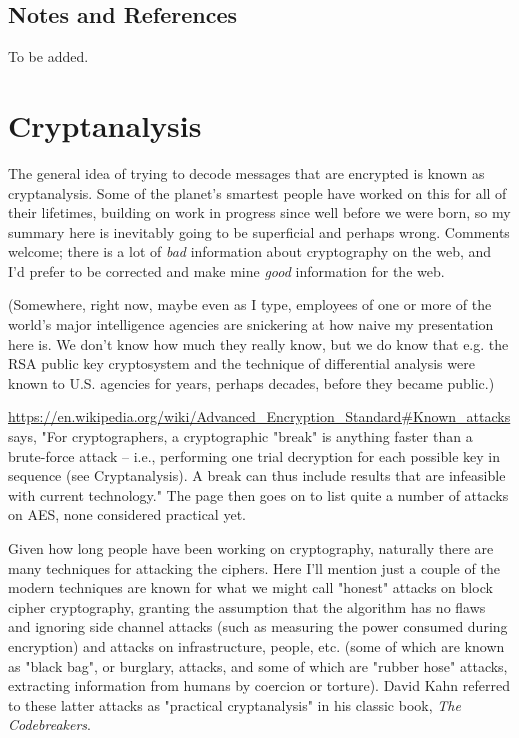 \documentclass[%
 aip,
 jmp,%
 amsmath,amssymb,
 reprint,%
]{revtex4-1}
\begin{document}
\subsection{Notes and References}

To be added.

\section{Cryptanalysis}

The general idea of trying to decode messages that are encrypted is
known as cryptanalysis.  Some of the planet's smartest people have
worked on this for all of their lifetimes, building on work in
progress since well before we were born, so my summary here is
inevitably going to be superficial and perhaps wrong.  Comments
welcome; there is a lot of \emph{bad} information about cryptography on the
web, and I'd prefer to be corrected and make mine \emph{good} information
for the web.

(Somewhere, right now, maybe even as I type, employees of one or more
of the world's major intelligence agencies are snickering at how naive
my presentation here is.  We don't know how much they really know, but
we do know that e.g. the RSA public key cryptosystem and the technique
of differential analysis were known to U.S. agencies for years,
perhaps decades, before they became public.)

\url{https://en.wikipedia.org/wiki/Advanced_Encryption_Standard#Known_attacks}
says, "For cryptographers, a cryptographic "break" is anything faster
than a brute-force attack – i.e., performing one trial decryption for
each possible key in sequence (see Cryptanalysis). A break can thus
include results that are infeasible with current technology."
The page then goes on to list quite a number of attacks on AES, none
considered practical yet.

Given how long people have been working on cryptography, naturally
there are many techniques for attacking the ciphers.  Here I'll
mention just a couple of the modern techniques are known for what we
might call "honest" attacks on block cipher cryptography, granting the
assumption that the algorithm has no flaws and ignoring side channel
attacks (such as measuring the power consumed during encryption) and
attacks on infrastructure, people, etc. (some of which are known as
"black bag", or burglary, attacks, and some of which are "rubber hose"
attacks, extracting information from humans by coercion or torture).
David Kahn referred to these latter attacks as "practical
cryptanalysis" in his classic book, \emph{The Codebreakers}.
\end{document}
